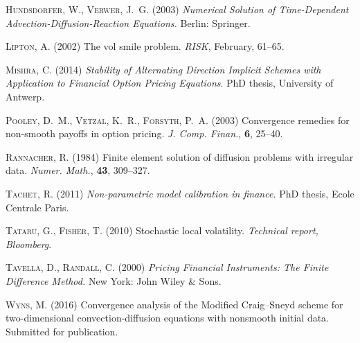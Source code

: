 \documentclass[10pt]{article}
\begin{document}
\begin{thebibliography}{99}
 \textsc{Hundsdorfer, W., Verwer, J.~G.} (2003)
\textit{Numerical Solution of Time-Dependent Advection-Diffusion-Reaction Equations.}
Berlin: Springer.

 \textsc{Lipton, A.} (2002)
The vol smile problem.
\textit{RISK}, February, 61--65.

 \textsc{Mishra, C.} (2014)
\textit{Stability of Alternating Direction Implicit Schemes with Application to Financial
Option Pricing Equations}.
PhD thesis, University of Antwerp.

 \textsc{Pooley, D.~M., Vetzal, K.~R., Forsyth, P.~A.} (2003)
Convergence remedies for non-smooth payoffs in option pricing.
\textit{J. Comp. Finan.}, \textbf{6}, 25--40.

 \textsc{Rannacher, R.} (1984)
Finite element solution of diffusion problems with irregular data.
\textit{Numer. Math.}, \textbf{43}, 309--327.

 \textsc{Tachet, R.} (2011)
\textit{Non-parametric model calibration in finance.}
PhD thesis, Ecole Centrale Paris.

 \textsc{Tataru, G., Fisher, T.} (2010)
Stochastic local volatility.
\textit{Technical report, Bloomberg}.

 \textsc{Tavella, D., Randall, C.} (2000)
\textit{Pricing Financial Instruments: The Finite Difference Method.}
New York: John Wiley \& Sons.

 \textsc{Wyns, M.} (2016)
Convergence analysis of the Modified Craig--Sneyd scheme for two-dimensional 
convection-diffusion equations with nonsmooth initial data.
Submitted for publication.

\end{thebibliography}
\end{document}
